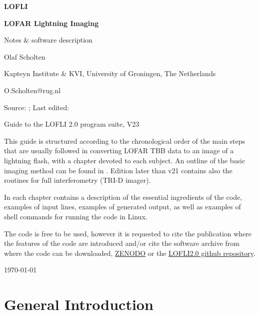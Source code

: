\documentclass[fleqn,11pt, A4paper]{book}
\newcommand*{\FileDate}[1]{\expandafter\filedateX\pdffilemoddate{#1}\relax}
\def\filedateX#1#2#3#4#5#6#7#8{%
\filedateXX{#3#4#5#6}{#7#8}}
\def\filedateXX#1#2#3#4#5#6#7#8{%
\filedateXXX{#1}{#2}{#3#4}{#5#6}{#7#8}}
\def\filedateXXX#1#2#3#4#5#6#7#8\relax{\formatdate{#1}{#2}{#3}{#4}{#5}{#6#7}}
\newcommand*{\formatdate}[6]{#1-#2-#3\ #4:#5:#6}
\begin{document}
\centerline{\LARGE \bf LOFLI}\vspace{2ex}
\centerline{\Large \bf LOFAR Lightning Imaging}\vspace{2ex}
\centerline{\Large Notes \& software description}\vspace{2ex}
\centerline{Olaf Scholten}\vspace{2ex}
\centerline{Kapteyn Institute \& KVI, University of Groningen, The Netherlands}\vspace{2ex}
\centerline{O.Scholten@rug.nl}\vspace{2ex}
\centerline{Source: \texttt{\jobname}; \hspace{3ex}
Last edited: \FileDate{\jobname.tex} }\vspace{15ex}
\centerline{\Large  Guide to the LOFLI 2.0 program suite, V23}


\newpage

\vspace{2ex}
This guide is structured according to the chronological order of the main steps that are usually followed in converting LOFAR TBB data to an image of a lightning flash, with a chapter devoted to each subject. An outline of the basic imaging method can be found in \cite{Scholten:2021-init}.
Edition later than v21 contains also the routines for full interferometry (TRI-D imager).

In each chapter contains a description of the essential ingredients of the code, examples of input lines, examples of generated output, as well as examples of shell commands for running the code in Linux.

The code is free to be used, however it is requested to cite the publication where the features of the code are introduced and/or cite the software archive from where the code can be downloaded, \href{https://zenodo.org/records/4707495}{ZENODO} or the \href{https://github.com/OlafScholten/LOFLI/tree/LOFLI2.0}{LOFLI2.0 github repository}.

\newpage

\tableofcontents


\hfill \today

\chapter{General Introduction}
\end{document}
